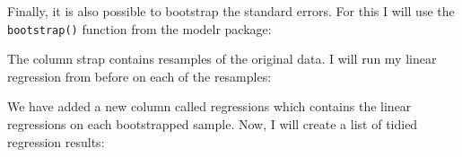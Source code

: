 \documentclass[]{book}
\newenvironment{Shaded}{\begin{snugshade}}{\end{snugshade}}
\newcommand{\DataTypeTok}[1]{\textcolor[rgb]{0.13,0.29,0.53}{#1}}
\newcommand{\DecValTok}[1]{\textcolor[rgb]{0.00,0.00,0.81}{#1}}
\newcommand{\KeywordTok}[1]{\textcolor[rgb]{0.13,0.29,0.53}{\textbf{#1}}}
\newcommand{\NormalTok}[1]{#1}
\newcommand{\OperatorTok}[1]{\textcolor[rgb]{0.81,0.36,0.00}{\textbf{#1}}}
\newcommand{\StringTok}[1]{\textcolor[rgb]{0.31,0.60,0.02}{#1}}
\begin{document}
Finally, it is also possible to bootstrap the standard errors. For this I will use the \texttt{bootstrap()} function from the modelr package:

\begin{Shaded}
\end{Shaded}

The column strap contains resamples of the original data. I will run my linear regression from before on each of the resamples:

\begin{Shaded}
\end{Shaded}

We have added a new column called regressions which contains the linear regressions on each bootstrapped sample. Now, I will create a list of tidied regression results:

\begin{Shaded}
\end{Shaded}

\begin{Shaded}
\end{Shaded}
\end{document}
